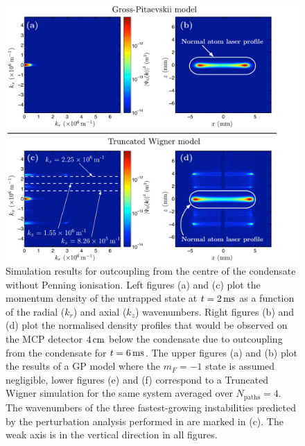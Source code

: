 \begin{figure}
    \centering
    \includegraphics[trim=0 0 52 0,width=14cm]{ResonantOutcouplingNoPI}
    \caption{Simulation results for outcoupling from the centre of the condensate without Penning ionisation. Left figures (a) and (c) plot the momentum density of the untrapped state at $t=\unit[2]{ms}$ as a function of the radial ($k_r$) and axial ($k_z$) wavenumbers. Right figures (b) and (d) plot the normalised density profiles that would be observed on the MCP detector $\unit[4]{cm}$ below the condensate due to outcoupling from the condensate for $t=\unit[6]{ms}$. The upper figures (a) and (b) plot the results of a GP model where the $m_F=-1$ state is assumed negligible, lower figures (e) and (f) correspond to a Truncated Wigner simulation for the same system averaged over $N_\text{paths} = 4$. The wavenumbers of the three fastest-growing instabilities predicted by the perturbation analysis performed in  are marked in (c). The weak axis is in the vertical direction in all figures.\label{Peaks:TheoryZeroDetuningNoPIResults}}
\end{figure}

